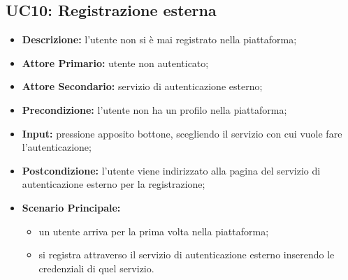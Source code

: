 \subsection{UC10: Registrazione esterna}
\label{sec:UC10}
\begin{itemize}
    \item \textbf{Descrizione:} l'utente non si è mai registrato nella piattaforma;
    \item \textbf{Attore Primario:} utente non autenticato;
    \item \textbf{Attore Secondario:} servizio di autenticazione esterno;
    \item \textbf{Precondizione:} l'utente non ha un profilo nella piattaforma;
    \item \textbf{Input:} pressione apposito bottone, scegliendo il servizio con cui vuole fare l'autenticazione;
    \item \textbf{Postcondizione:} l'utente viene indirizzato alla pagina del servizio di autenticazione esterno per la registrazione;
    \item \textbf{Scenario Principale:}
          \begin{itemize}
              \item un utente arriva per la prima volta nella piattaforma;
              \item si registra attraverso il servizio di autenticazione esterno inserendo le credenziali di quel servizio. 
          \end{itemize}
\end{itemize}